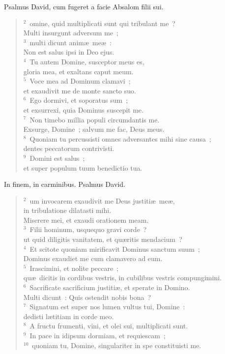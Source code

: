 \bchapter[Psalm]
Psalmus David, cum fugeret a facie Absalom filii sui.
\begin{verse}${}^{2}$~omine, quid multiplicati sunt qui tribulant me~?\\ Multi insurgunt adversum me~;\\
${}^{3}$~multi dicunt anim\ae\ me\ae~:\\ Non est salus ipsi in Deo ejus.\\
${}^{4}$~Tu autem Domine, susceptor meus es,\\ gloria mea, et exaltans caput meum.\\
${}^{5}$~Voce mea ad Dominum clamavi~;\\ et exaudivit me de monte sancto suo.\\
${}^{6}$~Ego dormivi, et soporatus sum~;\\ et exsurrexi, quia Dominus suscepit me.\\
${}^{7}$~Non timebo millia populi circumdantis me.\\ Exsurge, Domine~; salvum me fac, Deus meus.\\
${}^{8}$~Quoniam tu percussisti omnes adversantes mihi sine causa~;\\ dentes peccatorum contrivisti.\\
${}^{9}$~Domini est salus~;\\ et super populum tuum benedictio tua.\end{verse}



\bchapter[Psalm]
In finem, in carminibus. Psalmus David.
\begin{verse}${}^{2}$~um invocarem exaudivit me Deus justiti\ae\ me\ae ,\\ in tribulatione dilatasti mihi.\\ Miserere mei, et exaudi orationem meam.\\
${}^{3}$~Filii hominum, usquequo gravi corde~?\\ ut quid diligitis vanitatem, et qu\ae ritis mendacium~?\\
${}^{4}$~Et scitote quoniam mirificavit Dominus sanctum suum~;\\ Dominus exaudiet me cum clamavero ad eum.\\
${}^{5}$~Irascimini, et nolite peccare~;\\ qu\ae\ dicitis in cordibus vestris, in cubilibus vestris compungimini.\\
${}^{6}$~Sacrificate sacrificium justiti\ae , et sperate in Domino.\\ Multi dicunt~: Quis ostendit nobis bona~?\\
${}^{7}$~Signatum est super nos lumen vultus tui, Domine~:\\ dedisti l\ae titiam in corde meo.\\
${}^{8}$~A fructu frumenti, vini, et olei sui, multiplicati sunt.\\
${}^{9}$~In pace in idipsum dormiam, et requiescam~;\\
${}^{10}$~quoniam tu, Domine, singulariter in spe constituisti me.\end{verse}



